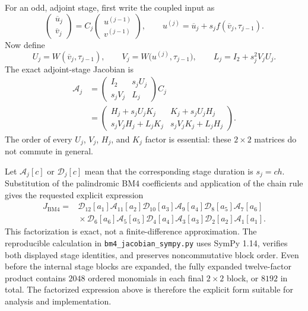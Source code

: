 \documentclass[11pt,a4paper]{article}
\newcommand{\Id}{I}
\begin{document}
For an odd, adjoint stage, first write the coupled input as
\[
 \begin{pmatrix}\overline u_j\\\overline v_j\end{pmatrix}
 =C_j
 \begin{pmatrix}u^{(j-1)}\\v^{(j-1)}\end{pmatrix},
 \qquad
 u^{(j)}=\overline u_j+s_jf(\overline v_j,\tau_{j-1}).
\]
Now define
\[
 U_j=W(\overline v_j,\tau_{j-1}),
 \qquad
 V_j=W\bigl(u^{(j)},\tau_{j-1}\bigr),
 \qquad
 L_j=\Id_2+s_j^2V_jU_j.
\]
The exact adjoint-stage Jacobian is
\[
 \boxed{
 \begin{aligned}
 \mathcal A_j
 &=
 \begin{pmatrix}
  \Id_2&s_jU_j\\
  s_jV_j&L_j
 \end{pmatrix}C_j\\[2mm]
 &=
 \begin{pmatrix}
  H_j+s_jU_jK_j&K_j+s_jU_jH_j\\
  s_jV_jH_j+L_jK_j&s_jV_jK_j+L_jH_j
 \end{pmatrix}.
 \end{aligned}
 }
\]
The order of every $U_j$, $V_j$, $H_j$, and $K_j$ factor is essential: these
$2\times2$ matrices do not commute in general.

Let $\mathcal A_j[c]$ or $\mathcal D_j[c]$ mean that the corresponding stage
duration is $s_j=ch$.  Substitution of the palindromic BM4 coefficients and
application of the chain rule gives the requested explicit expression
\[
 \boxed{
 \begin{aligned}
 J_{\mathrm{BM4}}={}&
 \mathcal D_{12}[a_1]\mathcal A_{11}[a_2]
 \mathcal D_{10}[a_3]\mathcal A_9[a_4]
 \mathcal D_8[a_5]\mathcal A_7[a_6]\\
 &{}\times
 \mathcal D_6[a_6]\mathcal A_5[a_5]
 \mathcal D_4[a_4]\mathcal A_3[a_3]
 \mathcal D_2[a_2]\mathcal A_1[a_1].
 \end{aligned}
 }
\]
This factorization is exact, not a finite-difference approximation.  The
reproducible calculation in \texttt{bm4\_jacobian\_sympy.py} uses SymPy 1.14,
verifies both displayed stage identities, and preserves noncommutative block
order.  Even before the internal stage blocks are expanded, the fully expanded
twelve-factor product contains $2048$ ordered monomials in each final
$2\times2$ block, or $8192$ in total.  The factorized expression above is
therefore the explicit form suitable for analysis and implementation.
\end{document}
